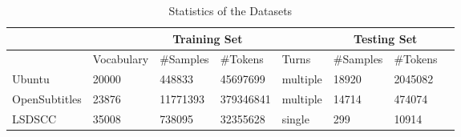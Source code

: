\begin{table}[H]
    \centering
    \caption{Statistics of the Datasets}
    \label{tab:dataset_stats}
    \begin{tabular}{|*{8}{l|}}
        \hline
        & \multicolumn{4}{c|}{Training Set} & \multicolumn{2}{c|}{Testing Set} \\
        \hline
        & Vocabulary & \#Samples & \#Tokens & Turns & \#Samples & \#Tokens \\
        \hline
        Ubuntu & 20000 & 448833 & 45697699 & multiple & 18920 & 2045082   \\
        \hline
        OpenSubtitles & 23876 & 11771393 & 379346841 & multiple & 14714 & 474074 \\
        \hline
        LSDSCC & 35008 & 738095 & 32355628 & single & 299 & 10914 \\
        \hline
    \end{tabular}
\end{table}